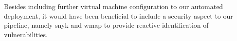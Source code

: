 Besides including further virtual machine configuration to our automated deployment, it would have been beneficial to include a security aspect to our pipeline, namely snyk and wmap to provide reactive identification of vulnerabilities. 


